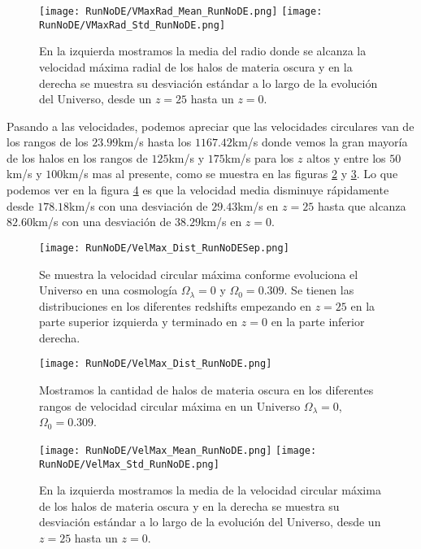 \begin{figure}[H]
    \centering
    \texttt{[image: RunNoDE/VMaxRad\_Mean\_RunNoDE.png]}
    \texttt{[image: RunNoDE/VMaxRad\_Std\_RunNoDE.png]}
    \caption[Media y desviación estándar del Radio donde se alcanza la velocidad máxima radial]{\footnotesize En la izquierda mostramos la media del radio donde se alcanza la velocidad máxima radial de los halos de materia oscura y en la derecha se muestra su desviación estándar a lo largo de la evolución del Universo, desde un $z=25$ hasta un $z=0$.}
    \label{fig:NoDE-VMaxRadStats}
\end{figure}


Pasando a las velocidades, podemos apreciar que las velocidades circulares van de los rangos de los $23.99$km/s hasta los $1167.42$km/s donde vemos la gran mayoría de los halos en los rangos de $125$km/s y $175$km/s para los $z$ altos y entre los $50$km/s y $100$km/s mas al presente, como se muestra en las figuras \ref{fig:NoDE-VelMaxDistSep} y \ref{fig:NoDE-VelMaxDist}. Lo que podemos ver en la figura \ref{fig:NoDE-VelMaxStats} es que la velocidad media disminuye rápidamente desde $178.18$km/s con una desviación de $29.43$km/s en $z=25$ hasta que alcanza $82.60$km/s con una desviación de $38.29$km/s en $z=0$.

\begin{figure}[H]
    \centering
    \texttt{[image: RunNoDE/VelMax\_Dist\_RunNoDESep.png]}
    \caption[Velocidad circular máxima]{\footnotesize Se muestra la velocidad circular máxima conforme evoluciona el Universo en una cosmología $\Omega_\lambda = 0$ y $\Omega_0 = 0.309$. Se tienen las distribuciones en los diferentes redshifts empezando en $z=25$ en la parte superior izquierda y terminado en $z=0$ en la parte inferior derecha.}
    \label{fig:NoDE-VelMaxDistSep}
\end{figure}

\begin{figure}[H]
    \centering
    \texttt{[image: RunNoDE/VelMax\_Dist\_RunNoDE.png]}
    \caption[Distribución de la velocidad circular máxima]{\footnotesize Mostramos la cantidad de halos de materia oscura en los diferentes rangos de velocidad circular máxima en un Universo $\Omega_\lambda = 0$, $\Omega_0 = 0.309$.}
    \label{fig:NoDE-VelMaxDist}
\end{figure}

\begin{figure}[H]
    \centering
    \texttt{[image: RunNoDE/VelMax\_Mean\_RunNoDE.png]}
    \texttt{[image: RunNoDE/VelMax\_Std\_RunNoDE.png]}
    \caption[Media y desviación estándar de la velocidad circular máxima]{\footnotesize En la izquierda mostramos la media de la velocidad circular máxima de los halos de materia oscura y en la derecha se muestra su desviación estándar a lo largo de la evolución del Universo, desde un $z=25$ hasta un $z=0$.}
    \label{fig:NoDE-VelMaxStats}
\end{figure}

